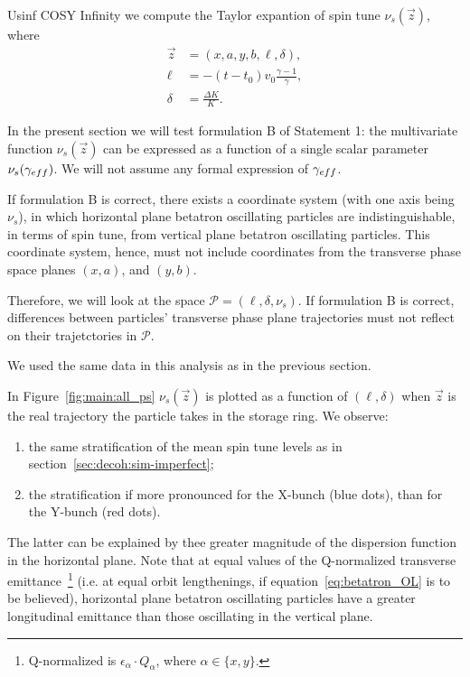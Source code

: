 \newcommand{\Ps}{\mathcal P}

Usinf COSY Infinity we compute the Taylor expantion of spin tune $\nu_s(\vec z)$, where
\begin{align*}
  \vec z &= (x,a,y,b,\ell,\delta), \\
  \ell &= -(t - t_0)v_0\frac{\gamma-1}{\gamma}, \\
  \delta &= \frac{\Delta K}{K}.
\end{align*}

In the present section we will test formulation B of Statement 1:
the multivariate function $\nu_s(\vec z)$ can be expressed as a function of a single scalar parameter
$\nu_s(\g*)$. We will not assume any formal expression of $\g*$.

If formulation B is correct, there exists a coordinate system (with one axis being $\nu_s$),
in which horizontal plane betatron oscillating particles are indistinguishable, in terms of spin tune,
from vertical plane betatron oscillating particles. This coordinate system, hence, must not include
coordinates from the transverse phase space planes $(x,a)$, and $(y,b)$.

Therefore, we will look at the space $\Ps=(\ell, \delta, \nu_s)$. If formulation B is correct,
differences between particles' transverse phase plane trajectories must not reflect on their
trajetctories in $\Ps$.

We used the same data in this analysis as in the previous section.

In Figure~\ref{fig:main:all_ps} $\nu_s(\vec z)$ is plotted as a function of $(\ell, \delta)$ when
$\vec z$ is the real trajectory the particle takes in the storage ring. We observe:
\begin{enumerate}
\item the same stratification of the mean spin tune levels as in section~\ref{sec:decoh:sim-imperfect};
  \item the stratification if more pronounced for the X-bunch (blue dots), than for the Y-bunch (red dots).
\end{enumerate}

The latter can be explained by thee greater magnitude of the dispersion function in the horizontal plane.
Note that at equal values of the Q-normalized transverse emittance~\footnote{Q-normalized is $\epsilon_\alpha\cdot Q_\alpha$, where $\alpha\in\{x,y\}$.} (i.e. at equal orbit lengthenings, if equation~\eqref{eq:betatron_OL}
is to be believed), horizontal plane betatron oscillating particles have a greater longitudinal emittance than
those oscillating in the vertical plane.

